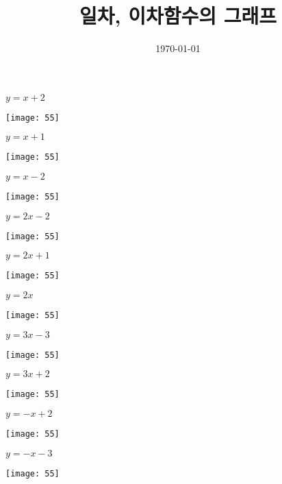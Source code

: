 \documentclass[a4paper]{oblivoir}
\title{일차, 이차함수의 그래프}
\date{\today}
\author{}
\begin{document}
\maketitle

\begin{minipage}{0.45\textwidth}\centering
\(y=x+2\)
\par\bigskip\texttt{[image: 55]}
\end{minipage}
\begin{minipage}{0.45\textwidth}\centering
\(y=x+1\)
\par\bigskip\texttt{[image: 55]}
\end{minipage}\bigskip\bigskip\par
\begin{minipage}{0.45\textwidth}\centering
\(y=x-2\)
\par\bigskip\texttt{[image: 55]}
\end{minipage}
\begin{minipage}{0.45\textwidth}\centering
\(y=2x-2\)
\par\bigskip\texttt{[image: 55]}
\end{minipage}\bigskip\bigskip\par

\clearpage
\begin{minipage}{0.45\textwidth}\centering
\(y=2x+1\)
\par\bigskip\texttt{[image: 55]}
\end{minipage}
\begin{minipage}{0.45\textwidth}\centering
\(y=2x\)
\par\bigskip\texttt{[image: 55]}
\end{minipage}\bigskip\bigskip\par
\begin{minipage}{0.45\textwidth}\centering
\(y=3x-3\)
\par\bigskip\texttt{[image: 55]}
\end{minipage}
\begin{minipage}{0.45\textwidth}\centering
\(y=3x+2\)
\par\bigskip\texttt{[image: 55]}
\end{minipage}\bigskip\bigskip\par
\begin{minipage}{0.45\textwidth}\centering
\(y=-x+2\)
\par\bigskip\texttt{[image: 55]}
\end{minipage}
\begin{minipage}{0.45\textwidth}\centering
\(y=-x-3\)
\par\bigskip\texttt{[image: 55]}
\end{minipage}\bigskip\bigskip\par
\end{document}

